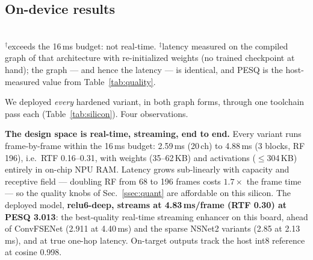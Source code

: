 \documentclass{article}
\begin{document}
\subsection{On-device results}
\label{ssec:silicon}

\begin{table}[t]
  \centering
  \caption{\textbf{On-device cost of every LiSenNet variant}, measured on the
  STM32N6570-DK (Neural-ART @ 1\,GHz, Cortex-M55 @ 800\,MHz), int8, one
  toolchain pass per row (stedgeai 4.0.1 $\to$ RAM firmware $\to$ on-target
  validation). Blocks (a) and (b) are the \emph{same} 16\,ms algorithmic
  latency and differ only in how the causal context is carried --- explicit
  FIFO state vs.\ recomputing the receptive-field window; (c) amortizes that
  window over a 64-frame emit block and is a throughput mode. ms/frame is per
  \emph{emitted} frame; RTF = ms/frame $\div$ 16\,ms. RF in frames; PESQ is
  wideband on the full 824-utterance split, as in Table~\ref{tab:quality}.}
  \label{tab:silicon}
  \small
  \setlength{\tabcolsep}{4.5pt}
  \\[2pt]
  {\footnotesize $^\dagger$exceeds the 16\,ms budget: not real-time.\quad
  $^\ddagger$latency measured on the compiled graph of that architecture with
  re-initialized weights (no trained checkpoint at hand); the graph --- and
  hence the latency --- is identical, and PESQ is the host-measured value from
  Table~\ref{tab:quality}.}
\end{table}

We deployed \emph{every} hardened variant, in both graph forms, through one
toolchain pass each (Table~\ref{tab:silicon}). Four observations.

\textbf{The design space is real-time, streaming, end to end.} Every variant
runs frame-by-frame within the 16\,ms budget: 2.59\,ms (20\,ch) to 4.88\,ms
(3 blocks, RF 196), i.e.\ RTF 0.16--0.31, with weights (35--62\,KB) and
activations ($\leq$304\,KB) entirely in on-chip NPU RAM. Latency grows
sub-linearly with capacity and receptive field --- doubling RF from 68 to 196
frames costs $1.7\times$ the frame time --- so the quality knobs of
Sec.~\ref{ssec:quant} are affordable on this silicon. The deployed model,
\textbf{relu6-deep, streams at 4.83\,ms/frame (RTF 0.30) at PESQ 3.013}: the
best-quality real-time streaming enhancer on this board, ahead of ConvFSENet
(2.911 at 4.40\,ms) and the sparse NSNet2 variants (2.85 at 2.13\,ms), and at
true one-hop latency. On-target outputs track the host int8 reference at
cosine 0.998.
\end{document}
